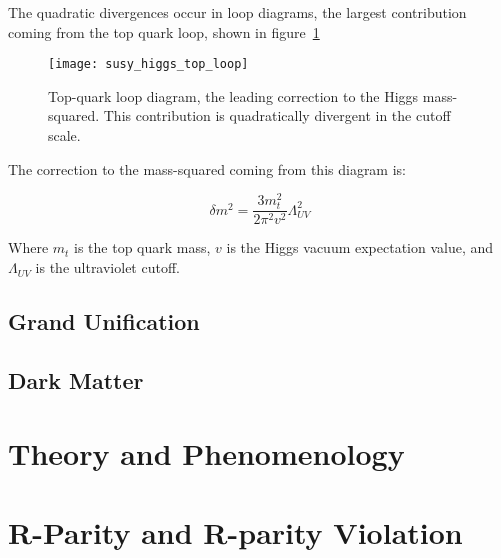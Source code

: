 The quadratic divergences occur in loop diagrams,
the largest contribution coming from the top quark loop, shown in figure~\ref{fig:susy_top_loop}

\begin{figure}[h!]
    \centering
\texttt{[image: susy\_higgs\_top\_loop]}
\caption{Top-quark loop diagram, the leading correction to the Higgs mass-squared. This contribution is quadratically divergent in the cutoff scale.}
\label{fig:susy_top_loop}
\end{figure}

The correction to the mass-squared coming from this diagram is:

\begin{equation}\label{eq:higgs_top_correction}
    \delta m^2 = \frac{3m_t^2}{2\pi^2 v^2}\Lambda_{UV}^2
\end{equation}

Where $m_t$ is the top quark mass, $v$ is the Higgs vacuum expectation value, and $\Lambda_{UV}$ is the ultraviolet cutoff.





\subsection{Grand Unification}\label{subsec:susy_unification}

\subsection{Dark Matter}\label{subsec:susy_dark_matter}

\section{Theory and Phenomenology}\label{sec:susy_theory}

\section{R-Parity and R-parity Violation}\label{sec:susy_rpv}
